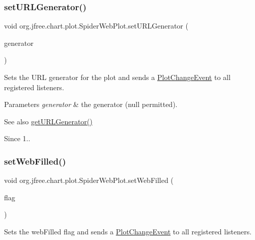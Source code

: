 \subsubsection{\texorpdfstring{set\+U\+R\+L\+Generator()}{setURLGenerator()}}
{\footnotesize\ttfamily void org.\+jfree.\+chart.\+plot.\+Spider\+Web\+Plot.\+set\+U\+R\+L\+Generator (\begin{DoxyParamCaption}\item[{\mbox{\hyperlink{interfaceorg_1_1jfree_1_1chart_1_1urls_1_1_category_u_r_l_generator}{Category\+U\+R\+L\+Generator}}}]{generator }\end{DoxyParamCaption})}

Sets the U\+RL generator for the plot and sends a \mbox{\hyperlink{}{Plot\+Change\+Event}} to all registered listeners.


\begin{DoxyParams}{Parameters}
{\em generator} & the generator ({\ttfamily null} permitted).\\
\hline
\end{DoxyParams}
\begin{DoxySeeAlso}{See also}
\mbox{\hyperlink{classorg_1_1jfree_1_1chart_1_1plot_1_1_spider_web_plot_a5ff43ff8150727508cf5789a00491db6}{get\+U\+R\+L\+Generator()}}
\end{DoxySeeAlso}
\begin{DoxySince}{Since}
1.. 
\end{DoxySince}
\mbox{\label{classorg_1_1jfree_1_1chart_1_1plot_1_1_spider_web_plot_aea33b93e61e56e9feec42809d7138707}} 
\subsubsection{\texorpdfstring{set\+Web\+Filled()}{setWebFilled()}}
{\footnotesize\ttfamily void org.\+jfree.\+chart.\+plot.\+Spider\+Web\+Plot.\+set\+Web\+Filled (\begin{DoxyParamCaption}\item[{boolean}]{flag }\end{DoxyParamCaption})}

Sets the web\+Filled flag and sends a \mbox{\hyperlink{}{Plot\+Change\+Event}} to all registered listeners.


